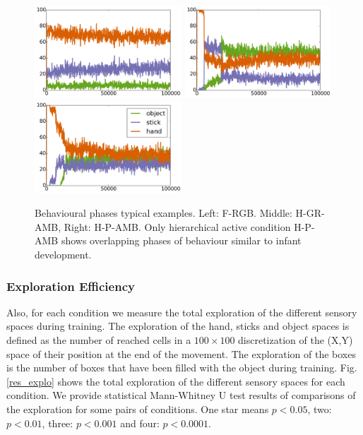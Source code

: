 \documentclass[10pt,letterpaper]{article}
\begin{document}
		\begin{figure}[ht]
			\centering
			\includegraphics[width=5.5cm]{./include/F-RGB-log53-events-100000.pdf}
			\includegraphics[width=5.5cm]{./include/H-RGB-GR-AMB-log13-events-100000.pdf}
			\includegraphics[width=5.5cm]{./include/H-RGB-P-AMB-log38-events-100000.pdf}
			\caption{Behavioural phases typical examples. Left: F-RGB. Middle: H-GR-AMB, Right: H-P-AMB. Only hierarchical active condition H-P-AMB shows overlapping phases of behaviour similar to infant development.}
			\label{res_ow}
		\end{figure}
		
	
	
	\subsubsection{Exploration Efficiency}

		Also, for each condition we measure the total exploration of the different sensory spaces during training. 
		The exploration of the hand, sticks and object spaces is defined as the number of reached cells 
		in a $100\times100$ discretization of the (X,Y) space of their position at the end of the movement.
		The exploration of the boxes is the number of boxes that have been filled with the object during training.
		Fig. \ref{res_explo} shows the total exploration of the different sensory spaces for each condition.
		We provide statistical Mann-Whitney U test results of comparisons of the exploration for some pairs of conditions.
		One star means $p<0.05$, two: $p<0.01$, three: $p<0.001$ and four: $p<0.0001$.
		
\end{document}
